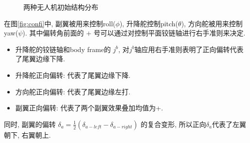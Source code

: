 \documentclass[UTF8,a4paper,10pt,nocolorlinks]{ctexart}
\begin{document}
    \begin{figure}[htpb]
      \centering
      \hspace{0.5in} %
      \caption{两种无人机初始结构分布}
    \end{figure}

    \par 在图\ref{fig:confi}中, 副翼被用来控制roll($\phi$), 升降舵控制pitch($\theta$), 方向舵被用来控制yaw($\psi$). 其中偏转角前面的 $+$ 号可以通过对控制平面铰链轴进行右手准则来决定. 
    \begin{itemize}
      \item 升降舵的铰链轴和body frame的 $j^{b}$, 对$j^{b}$轴应用右手准则表明了正向偏转代表了尾翼边缘下降. 
      \item 升降舵正向偏转: 代表了尾翼边缘下降. 
      \item 方向舵正向偏转: 代表了尾翼边缘左打. 
      \item 副翼正向偏转: 代表了两个副翼效果叠加均值为+.  
    \end{itemize}
    同时, 副翼的偏转 $\delta_{a} = \frac{1}{2} (\delta_{a-left} - \delta_{a-right})$ 的复合变形, 所以正向$\delta_{a}$代表了左翼朝下, 右翼朝上. 
\end{document}
